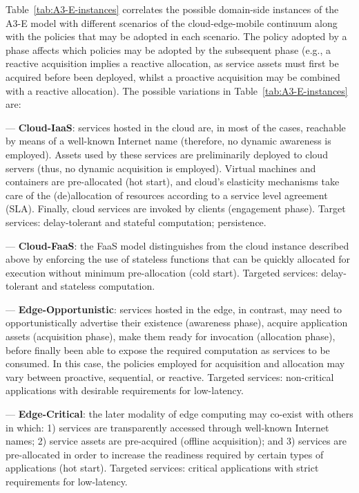 Table~\ref{tab:A3-E-instances} correlates the possible domain-side instances of the A3-E model with different scenarios of the cloud-edge-mobile continuum along with the policies that may be adopted in each scenario. The policy adopted by a phase affects which policies may be adopted by the subsequent phase (e.g., a reactive acquisition implies a reactive allocation, as service assets must first be acquired before been deployed, whilst a proactive acquisition may be combined with a reactive allocation). The possible variations in Table~\ref{tab:A3-E-instances} are:

--- \textbf{Cloud-IaaS}: services hosted in the cloud are, in most of the cases, reachable by means of a well-known Internet name (therefore, no dynamic awareness is employed). Assets used by these services are preliminarily deployed to cloud servers (thus, no dynamic acquisition is employed). Virtual machines and containers are pre-allocated (hot start), and cloud's elasticity mechanisms take care of the (de)allocation of resources according to a service level agreement (SLA). Finally, cloud services are invoked by clients (engagement phase). Target services: delay-tolerant and stateful computation; persistence.

--- \textbf{Cloud-FaaS}: the FaaS model distinguishes from the cloud instance described above by enforcing the use of stateless functions that can be quickly allocated for execution without minimum pre-allocation (cold start). Targeted services: delay-tolerant and stateless computation.

--- \textbf{Edge-Opportunistic}: services hosted in the edge, in contrast, may need to opportunistically advertise their existence (awareness phase), acquire application assets (acquisition phase), make them ready for invocation (allocation phase), before finally been able to expose the required computation as services to be consumed. In this case, the policies employed for acquisition and allocation may vary between proactive, sequential, or reactive. Targeted services: non-critical applications with desirable requirements for low-latency.

--- \textbf{Edge-Critical}: the later modality of edge computing may co-exist with others in which: 1) services are transparently accessed through well-known Internet names; 2) service assets are pre-acquired (offline acquisition); and 3) services are pre-allocated in order to increase the readiness required by certain types of applications (hot start). Targeted services: critical applications with strict requirements for low-latency.

